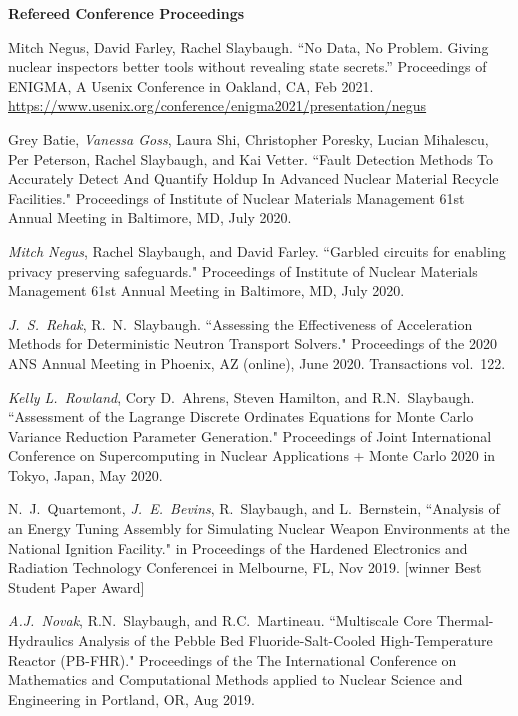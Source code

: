 \begin{bibsection}
\item \textbf{Refereed Conference Proceedings}
\item Mitch Negus, David Farley, Rachel Slaybaugh. “No Data, No Problem. Giving
nuclear inspectors better tools without revealing state secrets.” Proceedings of
ENIGMA, A Usenix Conference in Oakland, CA, Feb 2021.\\
\url{https://www.usenix.org/conference/enigma2021/presentation/negus}

\item Grey Batie, \textit{Vanessa Goss}, Laura Shi, Christopher Poresky, Lucian
Mihalescu, Per Peterson, Rachel Slaybaugh, and Kai Vetter. ``Fault Detection Methods To Accurately Detect And Quantify Holdup In Advanced Nuclear Material Recycle Facilities."  Proceedings of Institute
of Nuclear Materials Management 61st Annual Meeting in Baltimore, MD, July 2020.

\item \textit{Mitch Negus}, Rachel Slaybaugh, and David Farley. ``Garbled
circuits for enabling privacy preserving safeguards." Proceedings of Institute
of Nuclear Materials Management 61st Annual Meeting in Baltimore, MD, July 2020.

\item \textit{J.\ S.\ Rehak}, R.\ N.\ Slaybaugh. ``Assessing the Effectiveness
of Acceleration Methods for Deterministic Neutron Transport Solvers."
Proceedings of  the 2020 ANS Annual Meeting in Phoenix, AZ (online), June 2020.
Transactions vol.\ 122.

\item \textit{Kelly L.\ Rowland}, Cory D.\ Ahrens, Steven Hamilton, and R.N.\
Slaybaugh. ``Assessment of the Lagrange Discrete Ordinates Equations for Monte
Carlo Variance Reduction Parameter Generation." Proceedings of Joint
International Conference on Supercomputing in Nuclear Applications + Monte Carlo
2020 in Tokyo, Japan, May 2020. 

\item N.\ J.\ Quartemont, \textit{J.\ E.\ Bevins}, R.\ Slaybaugh, and L.\ Bernstein, ``Analysis
of an Energy Tuning Assembly for Simulating Nuclear Weapon Environments at the
National Ignition Facility." in Proceedings of the Hardened Electronics and
Radiation Technology Conferencei in Melbourne, FL, Nov 2019. [winner Best Student Paper Award]

\item \textit{A.J.\ Novak}, R.N.\ Slaybaugh, and R.C.\ Martineau. ``Multiscale
Core Thermal-Hydraulics Analysis of the Pebble Bed Fluoride-Salt-Cooled
High-Temperature Reactor (PB-FHR)." Proceedings of the The International
Conference on Mathematics and Computational Methods applied to Nuclear Science
and Engineering in Portland, OR, Aug 2019. 


\end{bibsection}
